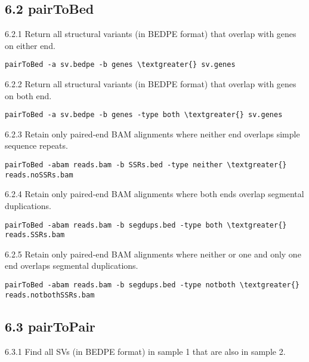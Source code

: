 \documentclass[letterpaper,10pt,english]{sphinxmanual}
\begin{document}
\subsection{6.2 pairToBed}
\label{content/example-usage:pairtobed}
6.2.1 Return all structural variants (in BEDPE format) that overlap with genes on either
end.

\begin{Verbatim}[commandchars=\\\{\}]
pairToBed -a sv.bedpe -b genes \textgreater{} sv.genes
\end{Verbatim}

6.2.2 Return all structural variants (in BEDPE format) that overlap with genes on both
end.

\begin{Verbatim}[commandchars=\\\{\}]
pairToBed -a sv.bedpe -b genes -type both \textgreater{} sv.genes
\end{Verbatim}

6.2.3 Retain only paired-end BAM alignments where neither end overlaps simple
sequence repeats.

\begin{Verbatim}[commandchars=\\\{\}]
pairToBed -abam reads.bam -b SSRs.bed -type neither \textgreater{} reads.noSSRs.bam
\end{Verbatim}

6.2.4 Retain only paired-end BAM alignments where both ends overlap segmental
duplications.

\begin{Verbatim}[commandchars=\\\{\}]
pairToBed -abam reads.bam -b segdups.bed -type both \textgreater{} reads.SSRs.bam
\end{Verbatim}

6.2.5 Retain only paired-end BAM alignments where neither or one and only one end
overlaps segmental duplications.

\begin{Verbatim}[commandchars=\\\{\}]
pairToBed -abam reads.bam -b segdups.bed -type notboth \textgreater{} reads.notbothSSRs.bam
\end{Verbatim}


\subsection{6.3 pairToPair}
\label{content/example-usage:pairtopair}
6.3.1 Find all SVs (in BEDPE format) in sample 1 that are also in sample 2.
\end{document}
